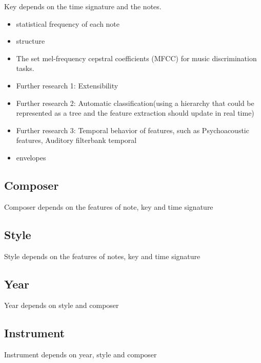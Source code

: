 \documentclass[a4paper,12pt]{article}
\begin{document}
Key depends on the time signature and the notes. 

\begin{itemize}
    \item statistical frequency of each note 
    \item structure 
    \item The set mel-frequency cepstral coefficients (MFCC) for music discrimination tasks.
    \item Further research 1: Extensibility
    \item Further research 2: Automatic classification(using a hierarchy that could be represented as a tree and the feature extraction should update in real time)
    \item Further research 3: Temporal behavior of features, such as Psychoacoustic features, Auditory filterbank temporal
    \item envelopes
\end{itemize}

\subsection{Composer}

Composer depends on the features of note, key and time signature

\subsection{Style}

Style depends on the features of notes, key and time signature

\subsection{Year}

Year depends on style and composer

\subsection{Instrument}

Instrument depends on year, style and composer


\end{document}
